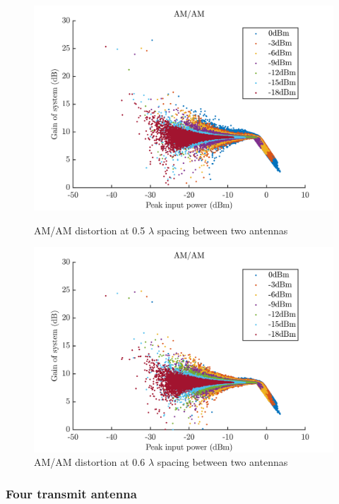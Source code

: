 \begin{figure}[H]
  \centering
  \begin{minipage}[b]{0.5\textwidth}
	\includegraphics[scale = 0.5]{figures/measurement/two_antenna/amam_05.png}
	\caption{AM/AM distortion at 0.5 $\lambda$ spacing between two antennas}
    \label{fig:amam05}
  \end{minipage}
  \hfill
  \begin{minipage}[b]{0.4\textwidth}
\includegraphics[scale = 0.5]{figures/measurement/two_antenna/amam_06.png}
\caption{AM/AM distortion at 0.6 $\lambda$ spacing between two antennas}
    \label{fig:amam06}
  \end{minipage}
\end{figure}

\subsubsection{Four transmit antenna}

